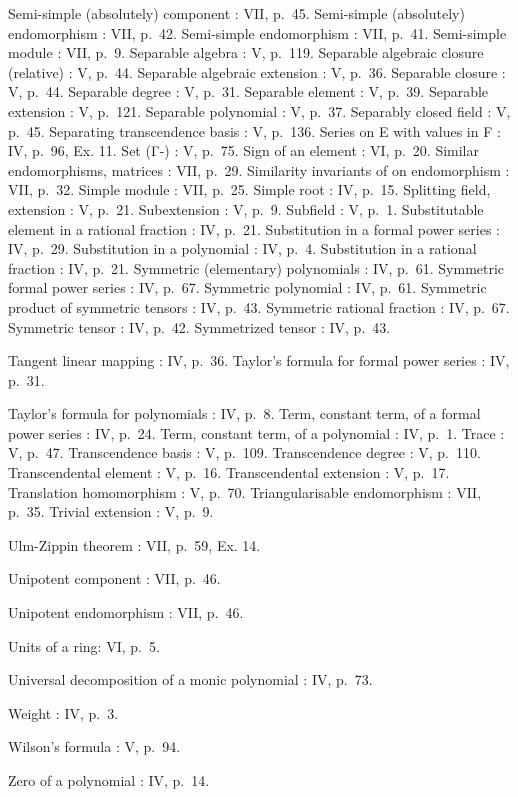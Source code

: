 Semi-simple (absolutely) component : VII, p.~45. Semi-simple (absolutely) endomorphism : VII, p.~42. Semi-simple endomorphism : VII, p.~41. Semi-simple module : VII, p.~9. Separable algebra : V, p.~119. Separable algebraic closure (relative) : V, p.~44. Separable algebraic extension : V, p.~36. Separable closure : V, p.~44. Separable degree : V, p.~31. Separable element : V, p.~39. Separable extension : V, p.~121. Separable polynomial : V, p.~37. Separably closed field : V, p.~45. Separating transcendence basis : V, p.~136. Series on E with values in F : IV, p.~96, Ex. 11. Set (Γ-) : V, p.~75. Sign of an element : VI, p.~20. Similar endomorphisms, matrices : VII, p.~29. Similarity invariants of on endomorphism : VII, p.~32. Simple module : VII, p.~25. Simple root : IV, p.~15. Splitting field, extension : V, p.~21. Subextension : V, p.~9. Subfield : V, p.~1. Substitutable element in a rational fraction : IV, p.~21. Substitution in a formal power series : IV, p.~29. Substitution in a polynomial : IV, p.~4. Substitution in a rational fraction : IV, p.~21. Symmetric (elementary) polynomials : IV, p.~61. Symmetric formal power series : IV, p.~67. Symmetric polynomial : IV, p.~61. Symmetric product of symmetric tensors : IV, p.~43. Symmetric rational fraction : IV, p.~67. Symmetric tensor : IV, p.~42. Symmetrized tensor : IV, p.~43.

Tangent linear mapping : IV, p.~36. Taylor's formula for formal power series : IV, p.~31.

Taylor's formula for polynomials : IV, p.~8. Term, constant term, of a formal power series : IV, p.~24. Term, constant term, of a polynomial : IV, p.~1. Trace : V, p.~47. Transcendence basis : V, p.~109. Transcendence degree : V, p.~110. Transcendental element : V, p.~16. Transcendental extension : V, p.~17. Translation homomorphism : V, p.~70. Triangularisable endomorphism : VII, p.~35. Trivial extension : V, p.~9.

Ulm-Zippin theorem : VII, p.~59, Ex. 14.

Unipotent component : VII, p.~46.

Unipotent endomorphism : VII, p.~46.

Units of a ring: VI, p.~5.

Universal decomposition of a monic polynomial : IV, p.~73.

Weight : IV, p.~3.

Wilson's formula : V, p.~94.

Zero of a polynomial : IV, p.~14.
\relax{}
